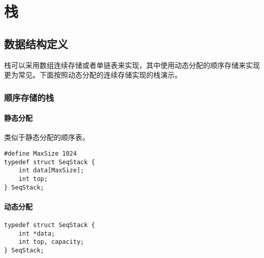 \documentclass{ctexart}
\begin{document}
\section{栈}

\subsection{数据结构定义}
栈可以采用数组连续存储或者单链表来实现，其中使用动态分配的顺序存储来实现更为常见。下面按照动态分配的连续存储实现的栈演示。

\subsubsection{顺序存储的栈}
\paragraph{静态分配} 类似于静态分配的顺序表。
\begin{verbatim}
#define MaxSize 1024
typedef struct SeqStack {
    int data[MaxSize];
    int top;
} SeqStack;
\end{verbatim}

\paragraph{动态分配}
\begin{verbatim}
typedef struct SeqStack {
    int *data;
    int top, capacity;
} SeqStack;
\end{verbatim}
\end{document}

